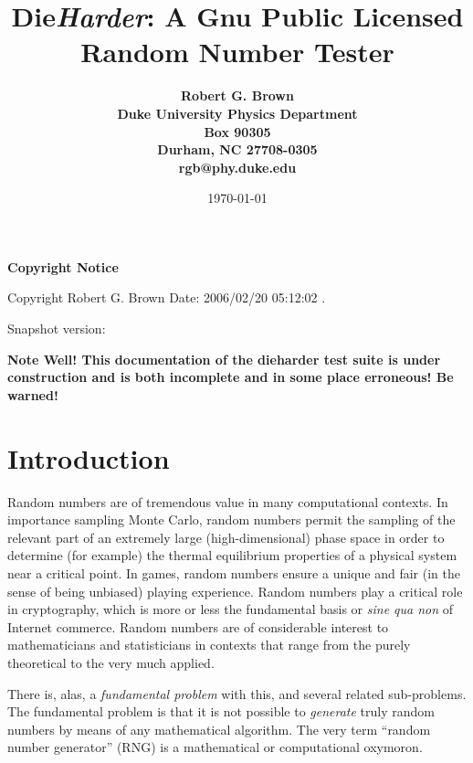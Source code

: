 \documentclass[12pt]{article}
\begin{document}
\title{Die{\em Harder}: A Gnu Public Licensed Random Number Tester}

\date{\today}

\author{\bf Robert G. Brown \\
Duke University Physics Department \\
Box 90305 \\
Durham, NC 27708-0305 \\
rgb@phy.duke.edu}

\maketitle

\vspace*{\fill}

\centerline{\large \bf Copyright Notice}
\centerline{Copyright Robert G. Brown 
$ $Date: 2006/02/20 05:12:02 $.$ }
\centerline{Snapshot version: \version}

\newpage

\tableofcontents

\newpage

{\large \bf Note Well!  This documentation of the dieharder test suite
is under construction and is both incomplete and in some place
erroneous!  Be warned!}

\section{Introduction}

Random numbers are of tremendous value in many computational contexts.
In importance sampling Monte Carlo, random numbers permit the sampling
of the relevant part of an extremely large (high-dimensional) phase
space in order to determine (for example) the thermal equilibrium
properties of a physical system near a critical point.  In games, random
numbers ensure a unique and fair (in the sense of being unbiased)
playing experience.  Random numbers play a critical role in
cryptography, which is more or less the fundamental basis or {\em sine
qua non} of Internet commerce.  Random numbers are of considerable
interest to mathematicians and statisticians in contexts that range from
the purely theoretical to the very much applied.

There is, alas, a {\em fundamental problem} with this, and several
related sub-problems.  The fundamental problem is that it is not
possible to {\em generate} truly random numbers by means of any
mathematical algorithm.  The very term ``random number generator'' (RNG)
is a mathematical or computational oxymoron.  
\end{document}
